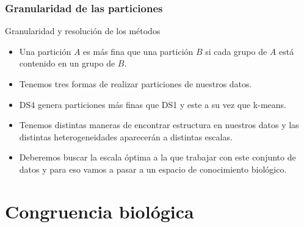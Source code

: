 \documentclass[serif,9pt, t]{beamer}
\begin{document}


\begin{frame}\frametitle{Granularidad de las particiones} 
Granularidad y resolución de los métodos
\bigskip
\begin{itemize}
\item Una partición $A$ es más fina que una partición $B$ si cada grupo de $A$ está contenido en un grupo de $B$.
\item Tenemos tres formas de realizar particiones de nuestros datos.
\item DS4 genera particiones más finas que DS1 y este a su vez que k-means.
\item Tenemos distintas maneras de encontrar estructura en nuestros datos y las distintas heterogeneidades aparecerán a distintas escalas.
\item Deberemos buscar la escala óptima a la que trabajar con este conjunto de datos y para eso vamos a pasar a un espacio de conocimiento biológico. 
\end{itemize}

\end{frame}

\section{Congruencia biológica}
\end{document}
